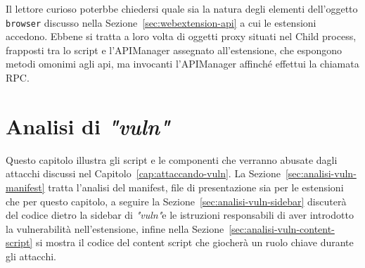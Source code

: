 \documentclass{sapthesis}
\newcommand{\code}[1]{\texttt{#1}}
\newcommand{\refSection}[1]{Sezione~\ref{#1}}
\newcommand{\refChapter}[1]{Capitolo~\ref{#1}}
\newcommand{\vuln}{\textit{"vuln"}}
\begin{document}
        Il lettore curioso poterbbe chiedersi quale sia la natura degli elementi dell'oggetto
        \code{browser} discusso nella \refSection{sec:webextension-api} a cui le estensioni accedono.
        Ebbene si tratta a loro volta di oggetti proxy situati nel Child process, frapposti tra lo
        script e l'APIManager assegnato all'estensione, che espongono metodi omonimi agli api, ma invocanti
        l'APIManager affinché effettui la chiamata RPC.


\chapter{Analisi di \vuln}
\label{cap:analisi-vuln}
    Questo capitolo illustra gli script e le componenti che verranno abusate dagli attacchi
    discussi nel \refChapter{cap:attaccando-vuln}.
    La \refSection{sec:analisi-vuln-manifest} tratta l'analisi del manifest, file di presentazione
    sia per le estensioni che per questo capitolo,
    a seguire la \refSection{sec:analisi-vuln-sidebar} discuterà del codice dietro la sidebar
    di \vuln e le istruzioni responsabili di aver introdotto la vulnerabilità nell'estensione,
    infine nella \refSection{sec:analisi-vuln-content-script} si mostra il codice del
    content script che giocherà un ruolo chiave durante gli attacchi.
\end{document}
